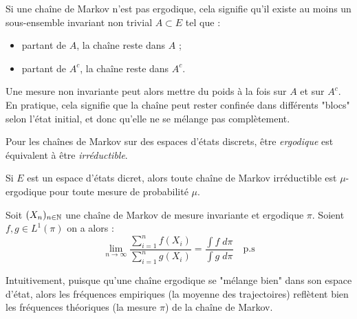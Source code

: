 \begin{remark}
    Si une chaîne de Markov n'est pas ergodique, cela signifie qu'il existe 
    au moins un sous-ensemble invariant non trivial $A \subset E$ tel que : 
    \begin{itemize}
        \item partant de $A$, la chaîne reste dans $A$ ;
        \item partant de $A^c$, la chaîne reste dans $A^c$.
    \end{itemize}

    Une mesure non invariante peut alors mettre du poids à la fois sur $A$ et sur $A^c$. 
    En pratique, cela signifie que la chaîne peut rester confinée dans différents 
    "blocs" selon l'état initial, et donc qu'elle ne se mélange pas complètement.  

\end{remark}

\begin{prop}
    Pour les chaînes de Markov sur des espaces d'états discrets, être \emph{ergodique} est équivalent à être \emph{irréductible}. 
\end{prop}

\begin{corollary}
    Si $E$ est un espace d'états dicret, alors toute chaîne de Markov irréductible est $ \mu$-ergodique pour toute 
    mesure de probabilité $ \mu$. 
\end{corollary}

\begin{theorem}
    Soit $(X_n)_{n \in \mathbb{N}}$ une chaîne de Markov de mesure invariante et ergodique $ \pi$. 
    Soient $f,g \in L^1( \pi)$ on a alors : 
        $$ \boxed{ \lim_{n \to \infty} \frac{\displaystyle \sum_{i=1}^{n} f(X_i)}{\displaystyle \sum_{i=1}^{n} g(X_i)} = \frac{ \displaystyle \int f \; d \pi}{ \displaystyle \int g \; d \pi} \quad \text{p.s} } $$
\end{theorem}

Intuitivement, puisque qu'une chaîne ergodique se "mélange bien" dans son espace d'état, alors 
les fréquences empiriques (la moyenne des trajectoires) reflètent bien les fréquences théoriques (la mesure $ \pi$) 
de la chaîne de Markov. 

